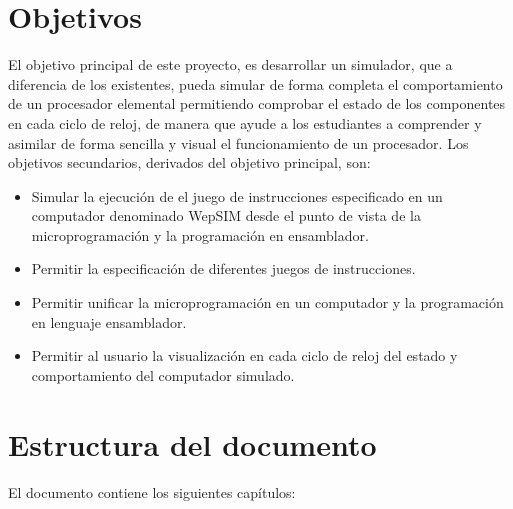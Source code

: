 \section{Objetivos}
\label{sec:objectives}

El objetivo principal de este proyecto, es desarrollar un simulador, que a diferencia de los existentes, pueda simular de forma completa el comportamiento de un procesador elemental permitiendo comprobar el estado de los componentes en cada ciclo de reloj, de manera que ayude a los estudiantes a comprender y asimilar de forma sencilla y visual el funcionamiento de un procesador. Los objetivos secundarios, derivados del objetivo principal, son:

\begin{itemize}

\item Simular la ejecución de el juego de instrucciones especificado en un computador denominado WepSIM desde el punto de vista de la microprogramación y la programación en ensamblador.

\item Permitir la especificación de diferentes juegos de instrucciones.

\item Permitir unificar la microprogramación en un computador y la programación en lenguaje ensamblador.

\item Permitir al usuario la visualización en cada ciclo de reloj del estado y comportamiento del computador simulado.

\end{itemize}

\section{Estructura del documento}
\label{sec:document_structure}

El documento contiene los siguientes capítulos:

